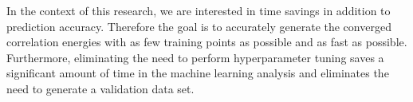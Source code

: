 In the context of this research, we are interested in time savings in addition to prediction accuracy. Therefore the goal is to accurately generate the converged correlation energies with as few training points as possible and as fast as possible. Furthermore, eliminating the need to perform hyperparameter tuning saves a significant amount of time in the machine learning analysis and eliminates the need to generate a validation data set.